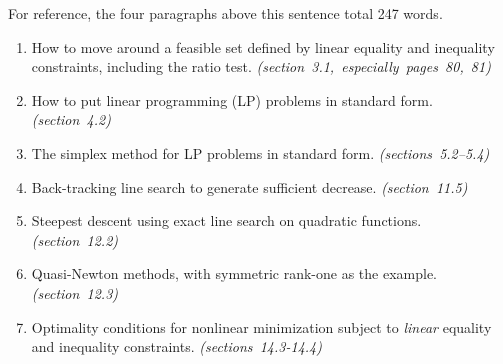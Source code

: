 \documentclass[12pt]{amsart}
\newcommand*\circled[1]{\tikz[baseline=(char.base)]{
            \node[shape=circle,draw,inner sep=2pt] (char) {#1};}}
\begin{document}
\smallskip
For reference, the four paragraphs above this sentence total 247 words.

\vspace{0.2in}

\newcommand{\ecomment}[1]{ \hfill \mbox{\emph{(#1)}} }

\smallskip
\renewcommand{\labelenumi}{\circled{\arabic{enumi}}}
\begin{enumerate}
\setlength{\itemsep}{4pt}
\item How to move around a feasible set defined by linear equality and inequality constraints, including the ratio test. \hfill \mbox{\emph{(section 3.1, especially pages 80, 81)}}
\item How to put linear programming (LP) problems in standard form.  \ecomment{section 4.2}
\item The simplex method for LP problems in standard form.  \ecomment{sections 5.2--5.4}
\item Back-tracking line search to generate sufficient decrease. \ecomment{section 11.5}
\item Steepest descent using exact line search on quadratic functions.  \ecomment{section 12.2}
\item Quasi-Newton methods, with symmetric rank-one as the example. \ecomment{section 12.3}
\item Optimality conditions for nonlinear minimization subject to \emph{linear} equality and inequality constraints.  \ecomment{sections 14.3-14.4}
\end{enumerate}
\end{document}
